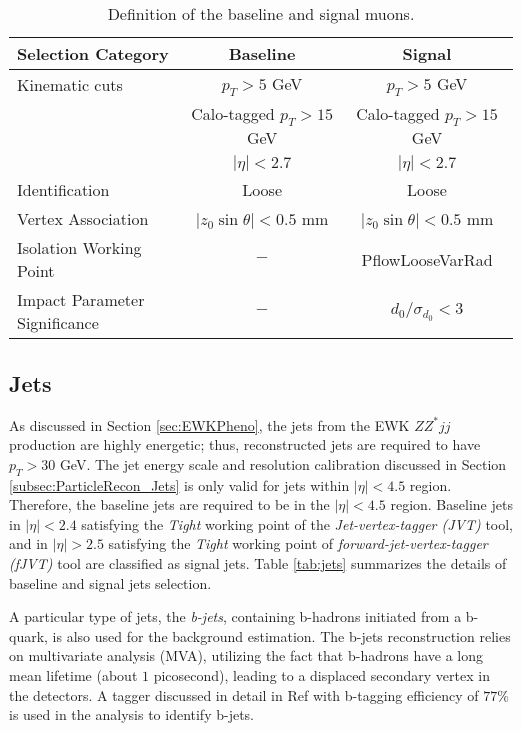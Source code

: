 \begin{table}[!htbp]
    \centering
        \caption{Definition of the baseline and signal muons.\label{tab:muon_baseline_signal}}
        \begin{tabular}{|| l || c | c ||}
        \hline
        Selection Category & \textbf{Baseline} & \textbf{Signal} \\
        \hline\hline
        Kinematic cuts & $p_{T} > 5$ GeV & $p_{T} > 5$ GeV \\
                    & Calo-tagged $ p_{T} > 15$ GeV & Calo-tagged $ p_{T} > 15$ GeV \\
              & $|\eta| < 2.7$ & $|\eta| < 2.7$\\
        \hline
        Identification & Loose & Loose \\
        \hline 
        Vertex Association & $|z_{0}\sin\theta| < 0.5$ mm & $|z_{0}\sin\theta|< 0.5$ mm\\
        \hline
        Isolation Working Point & $-$ & PflowLooseVarRad\\
        \hline 
        Impact Parameter Significance & $-$ & $d_{0}/\sigma_{d_{0}} < 3$ \\
        \hline
    \end{tabular}
\end{table}

\subsection{Jets}
\label{subsec:JetRecon} 
As discussed in Section \ref{sec:EWKPheno}, the jets from the EWK $ZZ^*jj$ production are highly energetic; thus, reconstructed jets are required to have $p_{T} > 30$ GeV. The jet energy scale and resolution calibration discussed in Section \ref{subsec:ParticleRecon_Jets} is only valid for jets within $ |\eta| < 4.5 $ region. Therefore, the baseline jets are required to be in the $ |\eta| < 4.5 $ region. Baseline jets in $ |\eta| < 2.4 $ satisfying the \textit{Tight} working point of the \textit{Jet-vertex-tagger (JVT)} tool, and in $ |\eta| > 2.5 $ satisfying the \textit{Tight} working point of \textit{forward-jet-vertex-tagger (fJVT)} tool are classified as signal jets. Table \ref{tab:jets} summarizes the details of baseline and signal jets selection. 

A particular type of jets, the \textit{b-jets}, containing b-hadrons initiated from a b-quark, is also used for the background estimation. The b-jets reconstruction relies on multivariate analysis (MVA), utilizing the fact that b-hadrons have a long mean lifetime (about $1$ picosecond), leading to a displaced secondary vertex in the detectors. A tagger discussed in detail in Ref \cite{bTagging} with b-tagging efficiency of $77\%$ is used in the analysis to identify b-jets.

